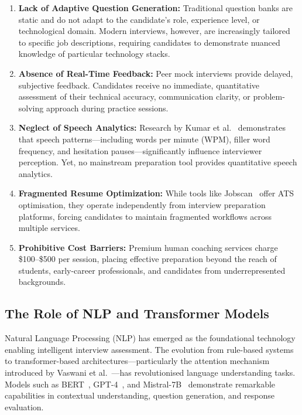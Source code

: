 \documentclass[12pt,a4paper,oneside]{report}
\begin{document}
\begin{enumerate}[label=(\roman*)]
  \item \textbf{Lack of Adaptive Question Generation:} Traditional question banks are static and do not adapt to the candidate's role, experience level, or technological domain. Modern interviews, however, are increasingly tailored to specific job descriptions, requiring candidates to demonstrate nuanced knowledge of particular technology stacks.

  \item \textbf{Absence of Real-Time Feedback:} Peer mock interviews provide delayed, subjective feedback. Candidates receive no immediate, quantitative assessment of their technical accuracy, communication clarity, or problem-solving approach during practice sessions.

  \item \textbf{Neglect of Speech Analytics:} Research by Kumar et al.~\cite{ref_kumar2024} demonstrates that speech patterns---including words per minute (WPM), filler word frequency, and hesitation pauses---significantly influence interviewer perception. Yet, no mainstream preparation tool provides quantitative speech analytics.

  \item \textbf{Fragmented Resume Optimization:} While tools like Jobscan~\cite{ref_jobscan} offer ATS optimisation, they operate independently from interview preparation platforms, forcing candidates to maintain fragmented workflows across multiple services.

  \item \textbf{Prohibitive Cost Barriers:} Premium human coaching services charge \$100--\$500 per session, placing effective preparation beyond the reach of students, early-career professionals, and candidates from underrepresented backgrounds.
\end{enumerate}

\subsection{The Role of NLP and Transformer Models}
Natural Language Processing (NLP) has emerged as the foundational technology enabling intelligent interview assessment. The evolution from rule-based systems to transformer-based architectures---particularly the attention mechanism introduced by Vaswani et al.~\cite{ref_vaswani2017}---has revolutionised language understanding tasks. Models such as BERT~\cite{ref_bert2018}, GPT-4~\cite{ref_openai2024}, and Mistral-7B~\cite{ref_mistral2023} demonstrate remarkable capabilities in contextual understanding, question generation, and response evaluation.
\end{document}
